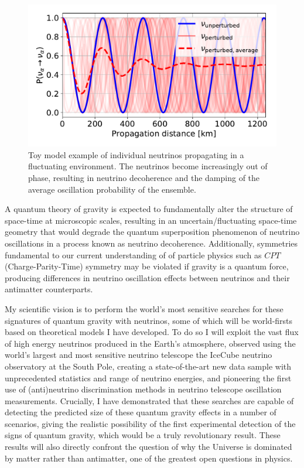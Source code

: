 \documentclass[a4paper,11pt]{article}
\begin{document}
\begin{figure} %
    \centering
		\vspace{-7pt}
		\includegraphics[width=1.\linewidth]{images/paper_plots_toy_model_net_decoh.pdf}
		\caption{Toy model example of individual neutrinos propagating in a fluctuating environment. The neutrinos become increasingly out of phase, resulting in neutrino decoherence and the damping of the average oscillation probability of the ensemble.}
		\vspace{-5pt}
		\label{fig:decoherence}
\end{figure}

A quantum theory of gravity is expected to fundamentally alter the structure of space-time at microscopic scales, resulting in an uncertain/fluctuating space-time geometry that would degrade the quantum superposition phenomenon of neutrino oscillations in a process known as neutrino decoherence. Additionally, symmetries fundamental to our current understanding of of particle physics such as $CPT$ (Charge-Parity-Time) symmetry may be violated if gravity is a quantum force, producing differences in neutrino oscillation effects between neutrinos and their antimatter counterparts. 

My scientific vision is to perform the world's most sensitive searches for these signatures of quantum gravity with neutrinos, some of which will be world-firsts based on theoretical models I have developed. To do so I will exploit the vast flux of high energy neutrinos produced in the Earth's atmosphere, observed using the world's largest and most sensitive neutrino telescope the IceCube neutrino observatory at the South Pole, creating a state-of-the-art new data sample with unprecedented statistics and range of neutrino energies, and pioneering the first use of (anti)neutrino discrimination methods in neutrino telescope oscillation measurements. Crucially, I have demonstrated that these searches are capable of detecting the predicted size of these quantum gravity effects in a number of scenarios, giving the realistic possibility of the first experimental detection of the signs of quantum gravity, which would be a truly revolutionary result. These results will also directly confront the question of why the Universe is dominated by matter rather than antimatter, one of the greatest open questions in physics.
\end{document}
